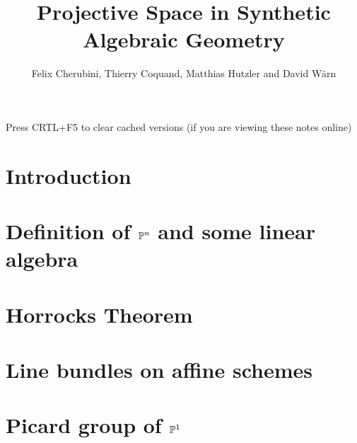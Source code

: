 \documentclass{../util/zariski}
\title{Projective Space in Synthetic Algebraic Geometry}
\begin{document}
\author{Felix Cherubini, Thierry Coquand, Matthias Hutzler and David Wärn}

\maketitle

\begin{center}
  \color{purple}
  \large{Press CRTL+F5 to clear cached versions}
  \large{(if you are viewing these notes online)}
\end{center}

\section*{Introduction}


\section[Definition of projective space and some linear algebra]{Definition of $\mathbb{P}^n$ and some linear algebra}


\section{Horrocks Theorem}


\section{Line bundles on affine schemes}


\section[Picard group of projective space]{Picard group of $\mathbb{P}^1$}


\newpage



\printindex

\printbibliography
\end{document}
